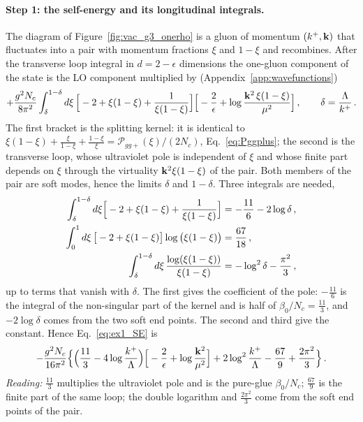 \paragraph{Step 1: the self-energy and its longitudinal integrals.} The diagram of Figure~\ref{fig:vac_g3_onerho} is a gluon of momentum $(k^+,\mathbf{k})$ that fluctuates into a pair with momentum fractions $\xi$ and $1-\xi$ and recombines. After the transverse loop integral in $d=2-\epsilon$ dimensions the one-gluon component of the state is the LO component multiplied by (Appendix~\ref{app:wavefunctions})
\begin{align}\label{eq:ex1_SE}
+\frac{g^2N_c}{8\pi^2}\int_{\delta}^{1-\delta}d\xi\,\Big[-2+\xi(1-\xi)+\frac{1}{\xi(1-\xi)}\Big]\Big[-\frac2\epsilon+\log\frac{\mathbf{k}^2\,\xi(1-\xi)}{\mu^2}\Big]\,,\qquad\delta=\frac{\Lambda}{k^+}\,.
\end{align}
The first bracket is the splitting kernel: it is identical to $\xi(1-\xi)+\frac{\xi}{1-\xi}+\frac{1-\xi}{\xi}=\mathcal P_{gg+}(\xi)/(2N_c)$, Eq.~\eqref{eq:Pggplus}; the second is the transverse loop, whose ultraviolet pole is independent of $\xi$ and whose finite part depends on $\xi$ through the virtuality $\mathbf{k}^2\xi(1-\xi)$ of the pair. Both members of the pair are soft modes, hence the limits $\delta$ and $1-\delta$. Three integrals are needed,
\begin{align}\label{eq:ex1_ints}
\int_\delta^{1-\delta}d\xi\Big[-2+\xi(1-\xi)+\frac{1}{\xi(1-\xi)}\Big]&=-\frac{11}{6}-2\log\delta\,,\notag\\
\int_0^1d\xi\,\big[-2+\xi(1-\xi)\big]\log\big(\xi(1-\xi)\big)&=\frac{67}{18}\,,\notag\\
\int_\delta^{1-\delta}d\xi\,\frac{\log(\xi(1-\xi))}{\xi(1-\xi)}&=-\log^2\delta-\frac{\pi^2}{3}\,,
\end{align}
up to terms that vanish with $\delta$. The first gives the coefficient of the pole: $-\frac{11}{6}$ is the integral of the non-singular part of the kernel and is half of $\beta_0/N_c=\frac{11}{3}$, and $-2\log\delta$ comes from the two soft end points. The second and third give the constant. Hence Eq.~\eqref{eq:ex1_SE} is
\begin{align}\label{eq:ex1_SEres}
-\frac{g^2N_c}{16\pi^2}\Big\{\Big(\frac{11}{3}-4\log\frac{k^+}{\Lambda}\Big)\Big[-\frac2\epsilon+\log\frac{\mathbf{k}^2}{\mu^2}\Big]+2\log^2\frac{k^+}{\Lambda}-\frac{67}{9}+\frac{2\pi^2}{3}\Big\}\,.
\end{align}
\emph{Reading:} $\frac{11}{3}$ multiplies the ultraviolet pole and is the pure-glue $\beta_0/N_c$; $\frac{67}{9}$ is the finite part of the same loop; the double logarithm and $\frac{2\pi^2}{3}$ come from the soft end points of the pair.

